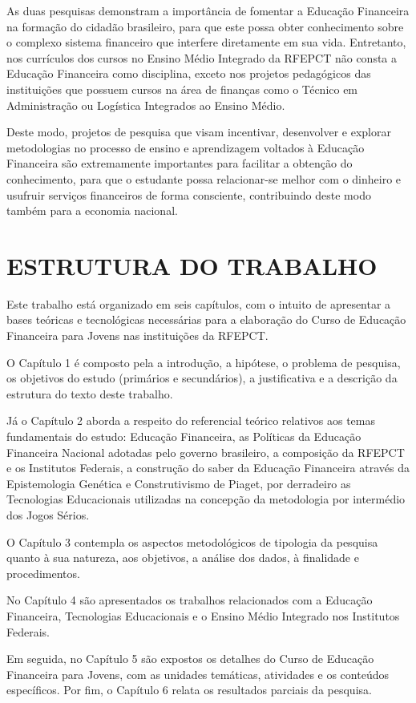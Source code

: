 As duas pesquisas demonstram a importância de fomentar a Educação Financeira na formação do cidadão brasileiro, para que este possa obter conhecimento sobre o complexo sistema financeiro que interfere diretamente em sua vida. Entretanto, nos currículos dos cursos no Ensino Médio Integrado da RFEPCT não consta a Educação Financeira como disciplina, exceto nos projetos pedagógicos  das instituições que possuem cursos na área de finanças como o Técnico em Administração ou Logística Integrados ao Ensino Médio.

Deste modo, projetos de pesquisa que visam incentivar, desenvolver e explorar metodologias no processo de ensino e aprendizagem voltados à Educação Financeira são extremamente importantes para facilitar a obtenção do conhecimento, para que o estudante possa relacionar-se melhor com o dinheiro e usufruir serviços financeiros de forma consciente, contribuindo deste modo também para a economia nacional.

\section{ESTRUTURA DO TRABALHO}
Este trabalho está organizado em seis capítulos, com o intuito de apresentar a bases teóricas e tecnológicas necessárias para a elaboração do Curso de Educação Financeira para Jovens nas instituições da RFEPCT.

O Capítulo 1 é composto pela a introdução, a hipótese, o problema de pesquisa, os objetivos do estudo (primários e secundários), a justificativa e a descrição da estrutura do texto deste trabalho.

Já o Capítulo 2 aborda a respeito do referencial teórico relativos aos temas fundamentais do estudo: Educação Financeira, as Políticas da Educação Financeira Nacional adotadas pelo governo brasileiro, a composição da RFEPCT e os Institutos Federais, a construção do saber da Educação Financeira através da Epistemologia Genética e Construtivismo de Piaget, por derradeiro as Tecnologias Educacionais utilizadas na concepção da metodologia por intermédio dos Jogos Sérios.

O Capítulo 3 contempla os aspectos metodológicos de tipologia da pesquisa quanto à sua natureza, aos objetivos, a análise dos dados, à finalidade e procedimentos.

No Capítulo 4 são apresentados os trabalhos relacionados com a Educação Financeira, Tecnologias Educacionais e o Ensino Médio Integrado nos Institutos Federais.

Em seguida, no Capítulo 5 são expostos os detalhes do Curso de Educação Financeira para Jovens, com as unidades temáticas, atividades e os conteúdos específicos. Por fim, o Capítulo 6 relata os resultados parciais da pesquisa.

